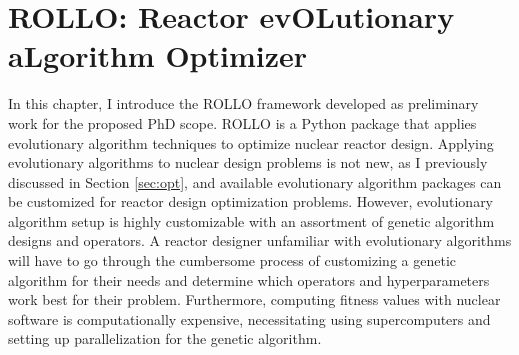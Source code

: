 \chapter{ROLLO: Reactor evOLutionary aLgorithm Optimizer}
\label{chap:rollo}
In this chapter, I introduce the \gls{ROLLO} framework developed as preliminary
work for the proposed PhD scope.
\gls{ROLLO} is a Python package that applies evolutionary algorithm 
techniques to optimize nuclear reactor design. 
Applying evolutionary algorithms to nuclear design problems is not new, as I
previously discussed in Section \ref{sec:opt}, and available evolutionary algorithm 
packages can be customized for reactor design optimization problems. 
However, evolutionary algorithm setup is highly customizable with
an assortment of genetic algorithm designs and operators.
A reactor designer unfamiliar with evolutionary algorithms will have
to go through the cumbersome process of customizing a genetic algorithm 
for their needs and determine which operators and hyperparameters work best for 
their problem. 
Furthermore, computing fitness values with nuclear software is computationally 
expensive, necessitating using supercomputers and setting up parallelization 
for the genetic algorithm.

